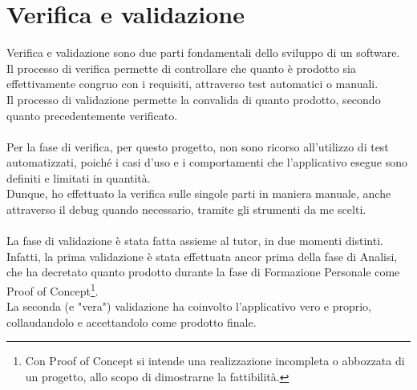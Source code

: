 \chapter{Verifica e validazione}
\label{cap:verifica-validazione}

Verifica e validazione sono due parti fondamentali dello sviluppo di un software.\\
Il processo di verifica permette di controllare che quanto è prodotto sia effettivamente congruo con i requisiti, attraverso test automatici o manuali.\\
Il processo di validazione permette la convalida di quanto prodotto, secondo quanto precedentemente verificato.\\\\
Per la fase di verifica, per questo progetto, non sono ricorso all'utilizzo di test automatizzati, poiché i casi d'uso e i comportamenti che l'applicativo esegue sono definiti e limitati in quantità.\\
Dunque, ho effettuato la verifica sulle singole parti in maniera manuale, anche attraverso il debug quando necessario, tramite gli strumenti da me scelti.\\\\
La fase di validazione è stata fatta assieme al tutor, in due momenti distinti.\\
Infatti, la prima validazione è stata effettuata ancor prima della fase di Analisi, che ha decretato quanto prodotto durante la fase di Formazione Personale come Proof of Concept\footnote{Con Proof of Concept si intende una realizzazione incompleta o abbozzata di un progetto, allo scopo di dimostrarne la fattibilità.}.\\
La seconda (e "vera") validazione ha coinvolto l'applicativo vero e proprio, collaudandolo e accettandolo come prodotto finale.
